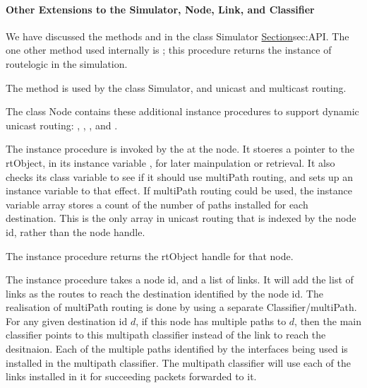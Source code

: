 \paragraph{Other Extensions to the Simulator, Node, Link, and Classifier}
\begin{list}{---}{}
\item   %
  We have discussed the methods  and 
  in the class Simulator \href{earlier}{Section}{sec:API}.
  The one other method used internally is
  ;
  this procedure returns the instance of routelogic in the simulation.

  The method is used by the class Simulator, and unicast and multicast routing.

\item   %
   The class Node contains these additional instance procedures
   to support dynamic unicast routing:
,
,
,
and
.

The instance procedure 
is invoked by the  at the node.
It stoeres a pointer to the rtObject, in its instance variable
, for later mainpulation or retrieval.
It also checks its class variable to see if it should use multiPath routing,
and sets up an instance variable to that effect.
If multiPath routing could be used,
the instance variable array  stores a count of the number of
paths installed for each destination.
This is the only array in unicast routing that is indexed by the node id,
rather than the node handle.

The instance procedure 
returns the rtObject handle for that node.

The instance procedure 
takes a node id, and a list of links.
It will add the list of links as the routes to reach the destination
identified by the node id.
The realisation of multiPath routing is done by using a separate
Classifier/multiPath.
For any given destination id $d$, if this node has multiple paths to $d$,
then the main classifier points to this multipath classifier instead of 
the link to reach the desitnaion.
Each of the multiple paths identified by the interfaces being used is
installed in the multipath classifier.
The multipath classifier will use each of the links installed in it for
succeeding packets forwarded to it.


\end{list}

